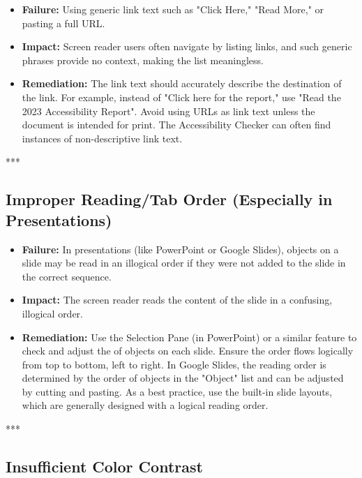 \begin{itemize}
	\item \textbf{Failure:} Using generic link text such as "Click Here," "Read More," or pasting a full URL.
	\item \textbf{Impact:} Screen reader users often navigate by listing links, and such generic phrases provide no context, making the list meaningless.
	\item \textbf{Remediation:} The link text should accurately describe the destination of the link. For example, instead of "Click here for the report," use "Read the 2023 Accessibility Report". Avoid using URLs as link text unless the document is intended for print. The Accessibility Checker can often find instances of non-descriptive link text.
\end{itemize}

***

\subsection{Improper Reading/Tab Order (Especially in Presentations)}
\label{sub:improper-reading-tab-order-especially-in-presentations}

\begin{itemize}
	\item \textbf{Failure:} In presentations (like PowerPoint or Google Slides), objects on a slide may be read in an illogical order if they were not added to the slide in the correct sequence.
	\item \textbf{Impact:} The screen reader reads the content of the slide in a confusing, illogical order.
	\item \textbf{Remediation:} Use the Selection Pane (in PowerPoint) or a similar feature to check and adjust the  of objects on each slide. Ensure the order flows logically from top to bottom, left to right. In Google Slides, the reading order is determined by the order of objects in the "Object" list and can be adjusted by cutting and pasting. As a best practice, use the built-in slide layouts, which are generally designed with a logical reading order.
\end{itemize}

***

\subsection{Insufficient Color Contrast}
\label{sub:insufficient-color-contrast}

